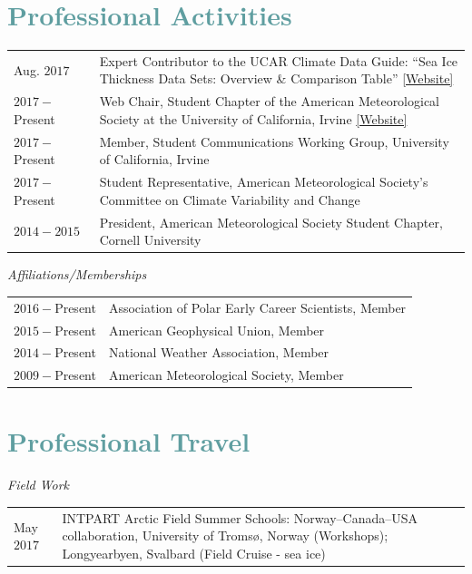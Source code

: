 \documentclass[margin,line,palatino,courier,10pt]{res}
\begin{document}
\begin{resume}
\vspace{-0.1in}
\noindent\makebox[\linewidth][r]{\rule{\textwidth}{5pt}}
\section{\sc \textcolor{CadetBlue}{\large{Professional Activities}}}
\vspace*{0.05in}
\begin{tabular}{@{}p{0.8in}p{4in}}
Aug. $2017$ & Expert Contributor to the UCAR Climate Data Guide: ``Sea Ice Thickness Data Sets: Overview \& Comparison Table'' \href{https://climatedataguide.ucar.edu/climate-data/sea-ice-thickness-data-sets-overview-comparison-table}{[Website]}\\
$2017 - $Present & Web Chair, Student Chapter of the American Meteorological Society at the University of California, Irvine \href{http://sites.uci.edu/zotcams/}{[Website]}\\
$2017 - $Present & Member, Student Communications Working Group, University of California, Irvine\\
$2017- $Present & Student Representative, American Meteorological Society's Committee on Climate Variability and Change\\
$2014-2015$ & President, American Meteorological Society Student Chapter, Cornell University\\
\end{tabular}

\textit{Affiliations/Memberships}
\vspace*{0.05in}\\
\begin{tabular}{@{}p{0.8in}p{4in}}
$2016 - $Present & Association of Polar Early Career Scientists, Member\\ 
$2015 - $Present & American Geophysical Union, Member\\
$2014 -$Present & National Weather Association, Member\\
$2009 -$Present & American Meteorological Society, Member\\
\end{tabular}

\section{\sc \textcolor{CadetBlue}{\large{Professional Travel}}}
\textit{Field Work}
\vspace*{0.05in}\\
\begin{tabular}{@{}p{0.8in}p{4in}}
May $2017$ & INTPART Arctic Field Summer Schools: Norway--Canada--USA collaboration, University of Troms\o, Norway (Workshops); Longyearbyen, Svalbard (Field Cruise - sea ice)
\end{tabular}


\end{resume}
\end{document}
